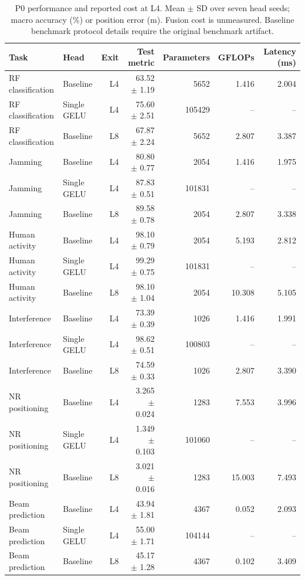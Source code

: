 \begin{table}[t]
\centering
\caption{P0 performance and reported cost at L4. Mean $\pm$ SD over seven head seeds; macro accuracy (\%) or position error (m). Fusion cost is unmeasured. Baseline benchmark protocol details require the original benchmark artifact.}
\begin{tabular}{llrrrrr}
\hline
Task & Head & Exit & Test metric & Parameters & GFLOPs & Latency (ms) \\
\hline
RF classification & Baseline & L4 & 63.52 $\pm$ 1.19 & 5652 & 1.416 & 2.004 \\
RF classification & Single GELU & L4 & 75.60 $\pm$ 2.51 & 105429 & -- & -- \\
RF classification & Baseline & L8 & 67.87 $\pm$ 2.24 & 5652 & 2.807 & 3.387 \\
Jamming & Baseline & L4 & 80.80 $\pm$ 0.77 & 2054 & 1.416 & 1.975 \\
Jamming & Single GELU & L4 & 87.83 $\pm$ 0.51 & 101831 & -- & -- \\
Jamming & Baseline & L8 & 89.58 $\pm$ 0.78 & 2054 & 2.807 & 3.338 \\
Human activity & Baseline & L4 & 98.10 $\pm$ 0.79 & 2054 & 5.193 & 2.812 \\
Human activity & Single GELU & L4 & 99.29 $\pm$ 0.75 & 101831 & -- & -- \\
Human activity & Baseline & L8 & 98.10 $\pm$ 1.04 & 2054 & 10.308 & 5.105 \\
Interference & Baseline & L4 & 73.39 $\pm$ 0.39 & 1026 & 1.416 & 1.991 \\
Interference & Single GELU & L4 & 98.62 $\pm$ 0.51 & 100803 & -- & -- \\
Interference & Baseline & L8 & 74.59 $\pm$ 0.33 & 1026 & 2.807 & 3.390 \\
NR positioning & Baseline & L4 & 3.265 $\pm$ 0.024 & 1283 & 7.553 & 3.996 \\
NR positioning & Single GELU & L4 & 1.349 $\pm$ 0.103 & 101060 & -- & -- \\
NR positioning & Baseline & L8 & 3.021 $\pm$ 0.016 & 1283 & 15.003 & 7.493 \\
Beam prediction & Baseline & L4 & 43.94 $\pm$ 1.81 & 4367 & 0.052 & 2.093 \\
Beam prediction & Single GELU & L4 & 55.00 $\pm$ 1.71 & 104144 & -- & -- \\
Beam prediction & Baseline & L8 & 45.17 $\pm$ 1.28 & 4367 & 0.102 & 3.409 \\
\hline
\end{tabular}
\end{table}

